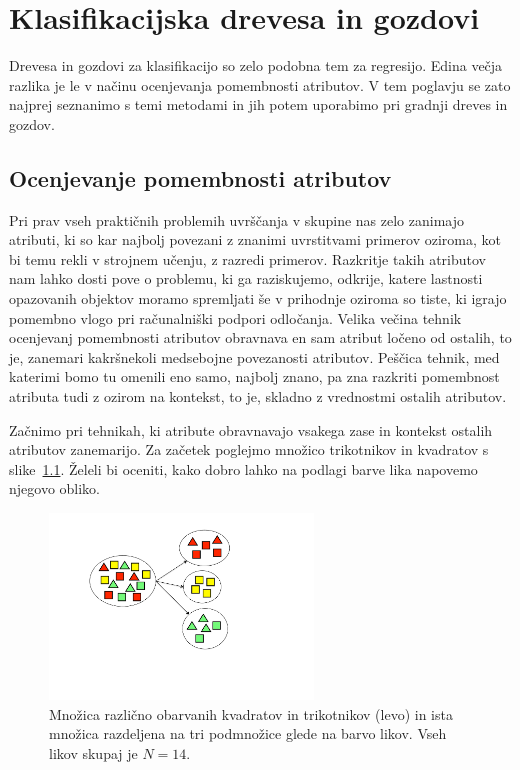 \chapter{Klasifikacijska drevesa in gozdovi}

Drevesa in gozdovi za klasifikacijo so zelo podobna tem za regresijo. Edina večja razlika je le v načinu ocenjevanja pomembnosti atributov. V tem poglavju se zato najprej seznanimo s temi metodami in jih potem uporabimo pri gradnji dreves in gozdov.

\section{Ocenjevanje pomembnosti atributov\label{c-attribute-scoring}}

Pri prav vseh praktičnih problemih uvrščanja v skupine nas zelo zanimajo atributi, ki so kar najbolj povezani z znanimi uvrstitvami primerov oziroma, kot bi temu rekli v strojnem učenju, z razredi primerov. Razkritje takih atributov nam lahko dosti pove o problemu, ki ga raziskujemo, odkrije, katere lastnosti opazovanih objektov moramo spremljati še v prihodnje oziroma so tiste, ki igrajo pomembno vlogo pri računalniški podpori odločanja. Velika večina tehnik ocenjevanj pomembnosti atributov obravnava en sam atribut ločeno od ostalih, to je, zanemari kakršnekoli medsebojne povezanosti atributov. Peščica tehnik, med katerimi bomo tu omenili eno samo, najbolj znano, pa zna razkriti pomembnost atributa tudi z ozirom na kontekst, to je, skladno z vrednostmi ostalih atributov.

Začnimo pri tehnikah, ki atribute obravnavajo vsakega zase in kontekst ostalih atributov zanemarijo. Za začetek poglejmo množico trikotnikov in kvadratov s slike~\ref{f-squares-triangles}. Želeli bi oceniti, kako dobro lahko na podlagi barve lika napovemo njegovo obliko. 

\begin{figure}[htbp]
\begin{center}
\includegraphics[width=7cm]{slike/squares-triangles.pdf}
\caption{Množica različno obarvanih kvadratov in trikotnikov (levo) in ista množica razdeljena na tri podmnožice glede na barvo likov. Vseh likov skupaj je $N=14$.}
\label{f-squares-triangles}
\end{center}
\end{figure}

